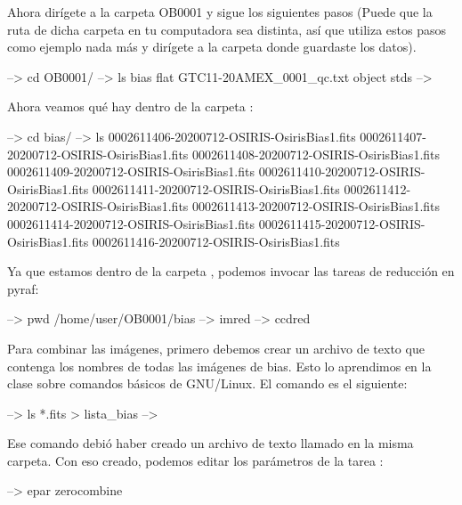 Ahora dirígete a la carpeta OB0001  y sigue los siguientes pasos (Puede que la ruta de dicha carpeta en tu computadora sea distinta, así que utiliza estos pasos como ejemplo nada más y dirígete a la carpeta donde guardaste los datos).

\begin{shell}
--> cd OB0001/
--> ls
bias  flat  GTC11-20AMEX_0001_qc.txt  object  stds	
-->  
\end{shell}

Ahora veamos qué hay dentro de la carpeta :

\begin{shell}
--> cd bias/
--> ls
0002611406-20200712-OSIRIS-OsirisBias1.fits
0002611407-20200712-OSIRIS-OsirisBias1.fits
0002611408-20200712-OSIRIS-OsirisBias1.fits
0002611409-20200712-OSIRIS-OsirisBias1.fits
0002611410-20200712-OSIRIS-OsirisBias1.fits
0002611411-20200712-OSIRIS-OsirisBias1.fits
0002611412-20200712-OSIRIS-OsirisBias1.fits
0002611413-20200712-OSIRIS-OsirisBias1.fits
0002611414-20200712-OSIRIS-OsirisBias1.fits
0002611415-20200712-OSIRIS-OsirisBias1.fits
0002611416-20200712-OSIRIS-OsirisBias1.fits
\end{shell}

Ya que estamos dentro de la carpeta , podemos invocar las tareas de reducción en pyraf:

\begin{shell}
--> pwd
/home/user/OB0001/bias
--> imred
--> ccdred
\end{shell}

Para combinar las imágenes, primero debemos crear un archivo de texto que contenga los nombres de todas las imágenes de bias. Esto lo aprendimos en la clase sobre comandos básicos de GNU/Linux. El comando es el siguiente:

\begin{shell}
--> ls *.fits > lista_bias
-->
\end{shell}

Ese comando debió haber creado un archivo de texto llamado  en la misma carpeta. Con eso creado, podemos editar los parámetros de la tarea :
\begin{shell}
--> epar zerocombine
\end{shell}

